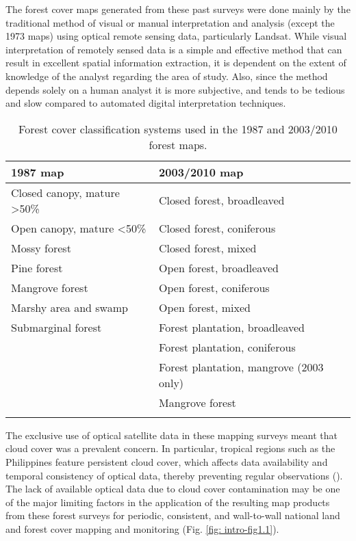 The forest cover maps generated from these past surveys were done mainly by the traditional method of visual or manual interpretation and analysis (except the 1973 maps) using optical remote sensing data, particularly Landsat. While visual interpretation of remotely sensed data is a simple and effective method that can result in excellent spatial information extraction, it is dependent on the extent of knowledge of the analyst regarding the area of study. Also, since the method depends solely on a human analyst it is more subjective, and tends to be tedious and slow compared to automated digital interpretation techniques.\\

\begin{spacing}{1.0}
\begin{longtable}[h!]{ p{7cm} p{7cm} }

    \caption[Forest cover classification systems used in the 1987, 2003, 2010 maps.]{Forest cover classification systems used in the 1987 and 2003/2010 forest maps.}
    \label{tab: intro-table1.2}\\
    
    	\toprule
    	1987 map & 2003/2010 map\\ 
    	\midrule
    	\endhead
    	
		Closed canopy, mature \textgreater 50\% & Closed forest, broadleaved\\
		Open canopy, mature \textless 50\% & Closed forest, coniferous\\
		Mossy forest & Closed forest, mixed\\
		Pine forest & Open forest, broadleaved\\
		Mangrove forest & Open forest, coniferous\\
		Marshy area and swamp & Open forest, mixed\\
		Submarginal forest & Forest plantation, broadleaved\\ 
		{} & Forest plantation, coniferous\\
		{} & Forest plantation, mangrove (2003 only)\\ 
		{} & Mangrove forest\\ 

    	\bottomrule \\
    
\end{longtable}	
\end{spacing}

The exclusive use of optical satellite data in these mapping surveys meant that cloud cover was a prevalent concern. In particular, tropical regions such as the Philippines feature persistent cloud cover, which affects data availability and temporal consistency of optical data, thereby preventing regular observations (\cite{myers_tropical_1988}). The lack of available optical data due to cloud cover contamination may be one of the major limiting factors in the application of the resulting map products from these forest surveys for periodic, consistent, and wall-to-wall national land and forest cover mapping and monitoring (Fig. \ref{fig: intro-fig1.1}).

